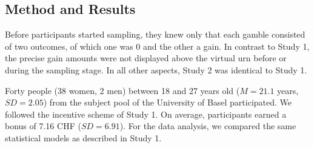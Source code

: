 \documentclass[a4paper, man, natbib, floatsintext]{apa6} %
\begin{document}
\subsection{Method and Results}
Before participants started sampling, they knew only that each gamble consisted of two outcomes, of which one was 0 and the other a gain. In contrast to Study 1, the precise gain amounts were not displayed above the virtual urn before or during the sampling stage. In all other aspects, Study 2 was identical to Study 1. 

Forty people (38 women, 2 men) between 18 and 27 years old ($M = 21.1$ years, $SD = 2.05$) from the subject pool of the University of Basel participated. We followed the incentive scheme of Study 1. On average, participants earned a bonus of 7.16 CHF ($SD = 6.91$). For the data analysis, we compared the same statistical models as described in Study 1.
\end{document}
